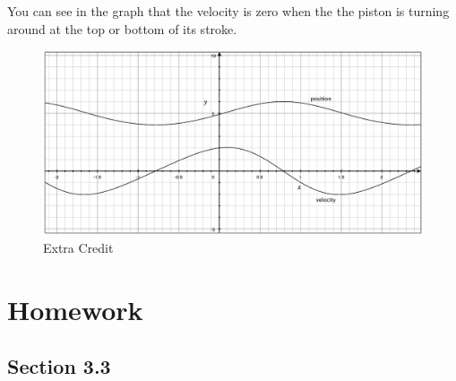 \documentclass{exam}
\begin{document}
You can see in the graph that the velocity is zero when the the piston is turning around at the top or bottom of its
stroke.

\begin{figure}[H]
  \centering
  \includegraphics[scale=.3]{extra_credit.eps}
  \caption*{Extra Credit}
\end{figure}

\section{Homework}

\subsection{Section 3.3}
\end{document}
